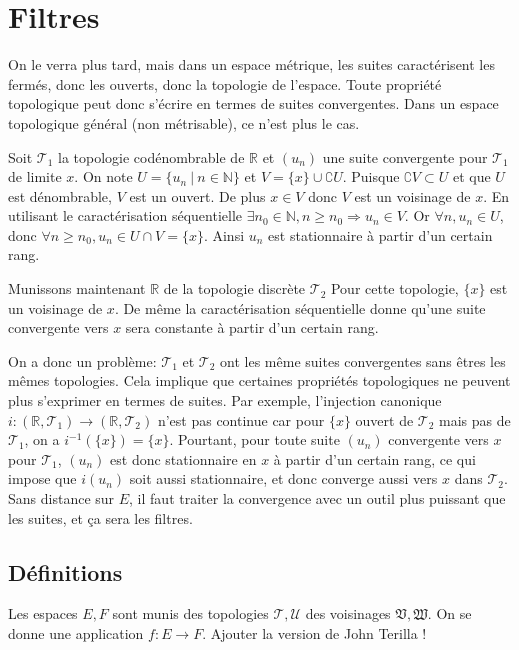 \documentclass[a4paper, 11pt, french]{book}
\theoremstyle{plain} %
\theoremstyle{definition} %
\theoremstyle{remark} %
\newcommand{\1}{\mathds{1}}
\newcommand{\inv}[1]{#1^{-1}}
\newcommand{\N}{\mathbb{N}}
\newcommand{\R}{\mathbb{R}}
\renewcommand{\frak}[1]{\mathfrak{#1}}
\newcommand{\scr}[1]{\mathscr{#1}}
\newcommand\ens[2]{\{#1 \ |\ #2\}}
\begin{document}
\chapter{Filtres}

On le verra plus tard, mais dans un espace métrique, les suites caractérisent les fermés, donc les ouverts, donc la topologie de l’espace.
Toute propriété topologique peut donc s’écrire en termes de suites convergentes.
Dans un espace topologique général (non métrisable), ce n’est plus le cas.

Soit $\scr{T}_1$ la topologie codénombrable de $\R$ et $(u_n)$ une suite convergente pour $\scr{T}_1$ de limite $x$.
On note $U=\ens{u_n}{n\in\N}$ et $V=\{x\}\cup\complement U$.
Puisque $\complement V\subset U$ et que $U$ est dénombrable, $V$ est un ouvert.
De plus $x\in V$ donc $V$ est un voisinage de $x$.
En utilisant le caractérisation séquentielle $\exists n_0\in\N, n\geqslant n_0\Rightarrow u_n\in V$.
Or $\forall n, u_n\in U$, donc $\forall n\geqslant n_0, u_n\in U\cap V=\{x\}$.
Ainsi $u_n$ est stationnaire à partir d'un certain rang.

Munissons maintenant $\R$ de la topologie discrète $\scr{T}_2$
Pour cette topologie, $\{x\}$ est un voisinage de $x$.
De même la caractérisation séquentielle donne qu'une suite convergente vers $x$ sera constante à partir d'un certain rang.

On a donc un problème: $\scr{T}_1$ et $\scr{T}_2$ ont les même suites convergentes sans êtres les mêmes topologies.
Cela implique que certaines propriétés topologiques ne peuvent plus s’exprimer en termes de suites.
Par exemple, l’injection canonique $i : (\R, \scr{T}_1)\rightarrow (\R, \scr{T}_2)$ n’est pas continue car pour $\{x\}$ ouvert de $\scr{T}_2$ mais pas de $\scr{T}_1$, on a $\inv{i}(\{x\})=\{x\}$.
Pourtant, pour toute suite $(u_n)$ convergente vers $x$ pour $\scr{T}_1$, $(u_n)$ est donc stationnaire en $x$ à partir d'un certain rang, ce qui impose que $i(u_n)$ soit aussi stationnaire, et donc converge aussi vers $x$ dans $\scr{T}_2$.
Sans distance sur $E$, il faut traiter la convergence avec un outil plus puissant que les suites, et ça sera les filtres.

\section{Définitions}

Les espaces $E, F$ sont munis des topologies $\scr{T}, \scr{U}$ des voisinages $\frak{V}, \frak{W}$.
On se donne une application $f:E\rightarrow F$.
{\color{red} Ajouter la version de John Terilla !}
\end{document}
